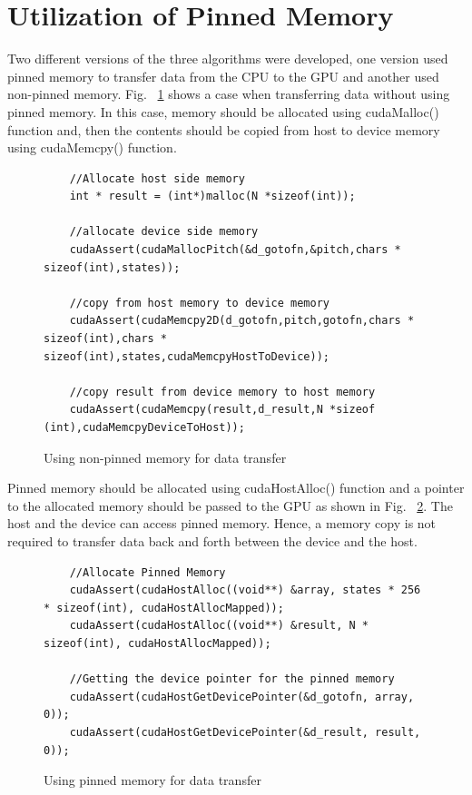 \section{Utilization of Pinned Memory}
Two different versions of the three algorithms were developed, one version used pinned memory to transfer data from the CPU to the GPU and another used non-pinned memory. Fig. ~\ref{fig:nonpinnedmemory} shows a case when transferring data without using pinned memory. In this case, memory should be allocated using cudaMalloc() function and, then the contents should be copied from host to device memory using cudaMemcpy() function. 

\begin{figure}[H]
	\begin{lstlisting}
	//Allocate host side memory
	int * result = (int*)malloc(N *sizeof(int));
	
	//allocate device side memory
	cudaAssert(cudaMallocPitch(&d_gotofn,&pitch,chars * sizeof(int),states));
	
	//copy from host memory to device memory
	cudaAssert(cudaMemcpy2D(d_gotofn,pitch,gotofn,chars * sizeof(int),chars * sizeof(int),states,cudaMemcpyHostToDevice));
	
	//copy result from device memory to host memory
	cudaAssert(cudaMemcpy(result,d_result,N *sizeof (int),cudaMemcpyDeviceToHost));
	\end{lstlisting}
	\caption{Using non-pinned memory for data transfer}
	\label{fig:nonpinnedmemory}
\end{figure}
\squeezeup

Pinned memory should be allocated using cudaHostAlloc() function and a pointer to the allocated memory should be passed to the GPU as shown in Fig. ~\ref{fig:pinnedmemory}. The host and the device can access pinned memory. Hence, a memory copy is not required to transfer data back and forth between the device and the host.

\begin{figure}[H]
	\begin{lstlisting}
	//Allocate Pinned Memory
	cudaAssert(cudaHostAlloc((void**) &array, states * 256 * sizeof(int), cudaHostAllocMapped));
	cudaAssert(cudaHostAlloc((void**) &result, N * sizeof(int), cudaHostAllocMapped));
	
	//Getting the device pointer for the pinned memory
	cudaAssert(cudaHostGetDevicePointer(&d_gotofn, array, 0));
	cudaAssert(cudaHostGetDevicePointer(&d_result, result, 0));
	\end{lstlisting}
	\caption{Using pinned memory for data transfer}
	\label{fig:pinnedmemory}
\end{figure}
\squeezeup
